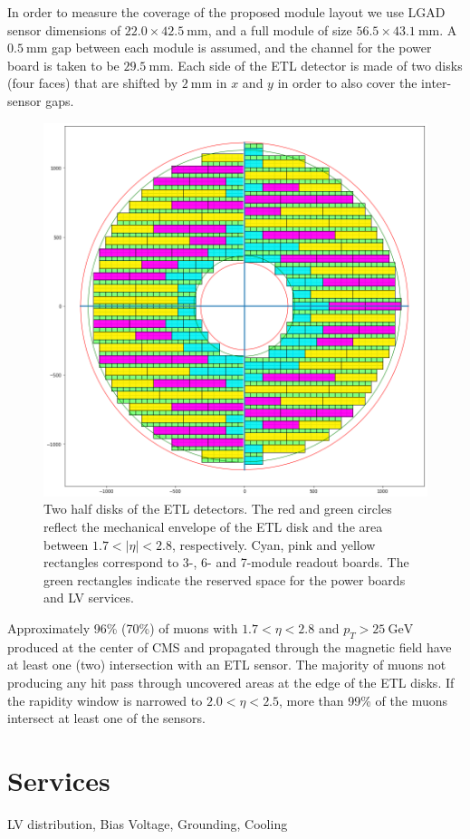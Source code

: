 \documentclass[11pt]{article}
\begin{document}
In order to measure the coverage of the proposed module layout we use LGAD sensor dimensions of $22.0 \times 42.5~\mathrm{mm}$, and a full module of size $56.5 \times 43.1~\mathrm{mm}$.
A $0.5~\mathrm{mm}$ gap between each module is assumed, and the channel for the power board is taken to be $29.5~\mathrm{mm}$.
Each side of the ETL detector is made of two disks (four faces) that are shifted by $2~\mathrm{mm}$ in $x$ and $y$ in order to also cover the inter-sensor gaps.

\begin{figure}[!h]
\centering
\includegraphics[width=0.60 \textwidth]{figures/coverage_both.png}
\caption{
Two half disks of the ETL detectors.
The red and green circles reflect the mechanical envelope of the ETL disk and the area between $1.7<|\eta|<2.8$, respectively.
Cyan, pink and yellow rectangles correspond to 3-, 6- and 7-module readout boards.
The green rectangles indicate the reserved space for the power boards and LV services.
}
\label{fig:coverage_both}
\end{figure}

Approximately 96\% (70\%) of muons with $1.7<\eta<2.8$ and $p_{T}>25~\mathrm{GeV}$ produced at the center of CMS and propagated through the magnetic field have at least one (two) intersection with an ETL sensor.
The majority of muons not producing any hit pass through uncovered areas at the edge of the ETL disks.
If the rapidity window is narrowed to $2.0<\eta<2.5$, more than 99\% of the muons intersect at least one of the sensors.

\section{Services}

LV distribution, Bias Voltage, Grounding, Cooling
\end{document}

